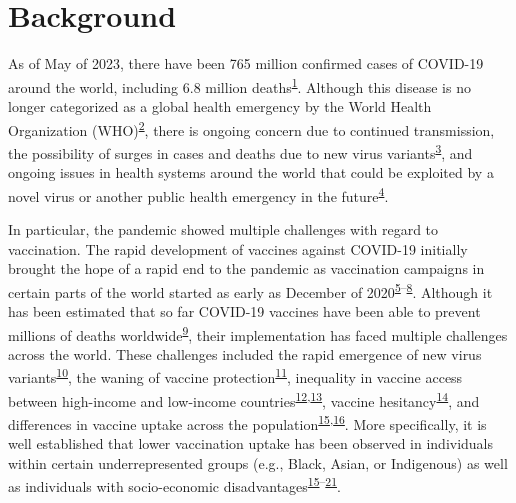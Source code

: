 \documentclass[
]{article}
\begin{document}
\hypertarget{background}{%
\section{Background}\label{background}}

As of May of 2023, there have been 765 million confirmed cases of
COVID-19 around the world, including 6.8 million
deaths\textsuperscript{\protect\hyperlink{ref-WHO-Covid}{1}}. Although
this disease is no longer categorized as a global health emergency by
the World Health Organization
(WHO)\textsuperscript{\protect\hyperlink{ref-rigby2023}{2}}, there is
ongoing concern due to continued transmission, the possibility of surges
in cases and deaths due to new virus
variants\textsuperscript{\protect\hyperlink{ref-un2023}{3}}, and ongoing
issues in health systems around the world that could be exploited by a
novel virus or another public health emergency in the
future\textsuperscript{\protect\hyperlink{ref-mackey2021}{4}}.

In particular, the pandemic showed multiple challenges with regard to
vaccination. The rapid development of vaccines against COVID-19
initially brought the hope of a rapid end to the pandemic as vaccination
campaigns in certain parts of the world started as early as December of
2020\textsuperscript{\protect\hyperlink{ref-thelancet2021}{5}--\protect\hyperlink{ref-tanne2020}{8}}.
Although it has been estimated that so far COVID-19 vaccines have been
able to prevent millions of deaths
worldwide\textsuperscript{\protect\hyperlink{ref-watson2022}{9}}, their
implementation has faced multiple challenges across the world. These
challenges included the rapid emergence of new virus
variants\textsuperscript{\protect\hyperlink{ref-li2021}{10}}, the waning
of vaccine
protection\textsuperscript{\protect\hyperlink{ref-dolgin2021}{11}},
inequality in vaccine access between high-income and low-income
countries\textsuperscript{\protect\hyperlink{ref-gerretsen2021}{12},\protect\hyperlink{ref-tamey2022}{13}},
vaccine
hesitancy\textsuperscript{\protect\hyperlink{ref-nafilyan2021}{14}}, and
differences in vaccine uptake across the
population\textsuperscript{\protect\hyperlink{ref-willis2021}{15},\protect\hyperlink{ref-skirrow2022}{16}}.
More specifically, it is well established that lower vaccination uptake
has been observed in individuals within certain underrepresented groups
(e.g., Black, Asian, or Indigenous) as well as individuals with
socio-economic
disadvantages\textsuperscript{\protect\hyperlink{ref-willis2021}{15}--\protect\hyperlink{ref-hussain2022}{21}}.
\end{document}
